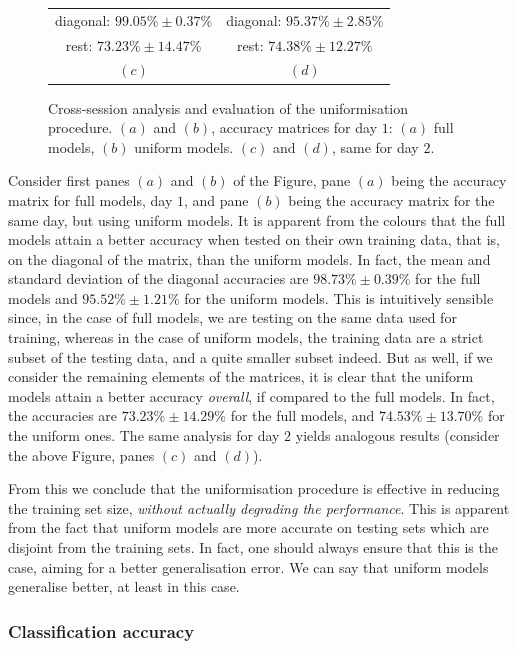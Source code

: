 \begin{figure}[!ht]
\begin{tabular}{cc}
    diagonal: $99.05\% \pm 0.37\%$ & diagonal: $95.37\% \pm 2.85\%$ \\
        rest: $73.23\% \pm 14.47\%$ & rest: $74.38\% \pm 12.27\%$ \\
    $(c)$ & $(d)$ \\
  \end{tabular}
  \caption{Cross-session analysis and evaluation of the uniformisation
    procedure. $(a)$ and $(b)$, accuracy matrices for day $1$: $(a)$
    full models, $(b)$ uniform models. $(c)$ and $(d)$, same for day $2$.}
  \label{fig:cross_initial}
\end{figure}

Consider first panes $(a)$ and $(b)$ of the Figure, pane $(a)$ being
the accuracy matrix for full models, day $1$, and pane $(b)$ being the
accuracy matrix for the same day, but using uniform models. It is
apparent from the colours that the full models attain a better
accuracy when tested on their own training data, that is, on the
diagonal of the matrix, than the uniform models. In fact, the mean and
standard deviation of the diagonal accuracies are $98.73\% \pm 0.39\%$
for the full models and $95.52\% \pm 1.21\%$ for the uniform
models. This is intuitively sensible since, in the case of full
models, we are testing on the same data used for training, whereas in
the case of uniform models, the training data are a strict subset of
the testing data, and a quite smaller subset indeed. But as well, if
we consider the remaining elements of the matrices, it is clear that
the uniform models attain a better accuracy \emph{overall}, if
compared to the full models. In fact, the accuracies are $73.23\% \pm
14.29\%$ for the full models, and $74.53\% \pm 13.70\%$ for the
uniform ones. The same analysis for day $2$ yields analogous results
(consider the above Figure, panes $(c)$ and $(d)$).

From this we conclude that the uniformisation procedure is effective
in reducing the training set size, \emph{without actually degrading
the performance}. This is apparent from the fact that uniform models
are more accurate on testing sets which are disjoint from the training
sets. In fact, one should always ensure that this is the case, aiming
for a better generalisation error. We can say that uniform models
generalise better, at least in this case.

\subsubsection{Classification accuracy}


